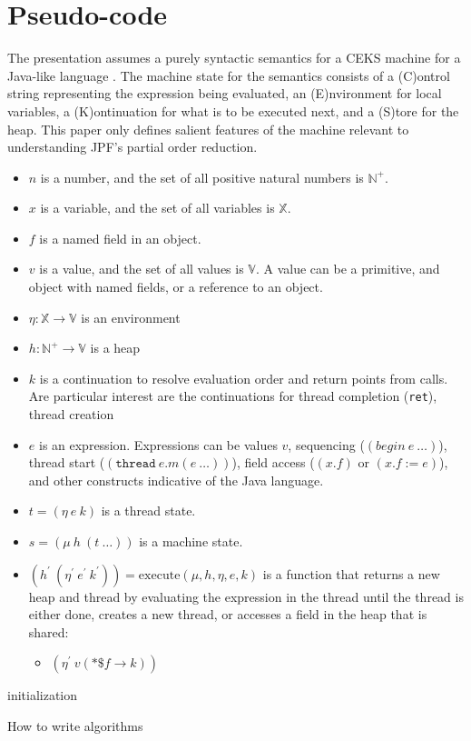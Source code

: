 \section{Pseudo-code}
The presentation assumes a purely syntactic semantics for a CEKS
machine for a Java-like language \cite{saints-MS}. The machine state
for the semantics consists of a (C)ontrol string representing the
expression being evaluated, an (E)nvironment for local variables, a
(K)ontinuation for what is to be executed next, and a (S)tore for the
heap. This paper only defines salient features of the machine relevant
to understanding JPF's partial order reduction. 
\begin{itemize}
\item $n$ is a number, and the set of all positive natural numbers is $\mathbb{N}^+$.
\item $x$ is a variable, and the set of all variables is $\mathbb{X}$.
\item $f$ is a named field in an object.
\item $v$ is a value, and the set of all values is $\mathbb{V}$. A value can be a primitive, and object with named fields, or a reference to an object. 
\item $\eta : \mathbb{X} \rightarrow \mathbb{V}$ is an environment
\item $h : \mathbb{N}^+ \rightarrow \mathbb{V}$ is a heap
\item $k$ is a continuation to resolve evaluation order and return points from calls. Are particular interest are the continuations for thread completion (\texttt{ret}), thread creation 
\item $e$ is an expression. Expressions can be values $v$, sequencing ($(begin\ e\ \ldots)$),
  thread start ($(\mathtt{thread}\ e.m(e\ \ldots))$), field access ($(x.f)$ or $(x.f := e)$), and other constructs
  indicative of the Java language.
\item $t = (\eta\ e\ k)$ is a thread state.
\item $s = (\mu\ h\ (t\ \ldots))$ is a machine state.
\item $(h^\prime\ (\eta^\prime \ e^\prime\ k^\prime)) = \mathrm{execute}(\mu, h, \eta, e, k)$ is a function that returns a new heap and thread by evaluating the expression in the thread until the thread is either done, creates a new thread, or accesses a field in the heap that is shared:
  \begin{itemize}
    \item $(\eta^\prime\ v (* \$ f \rightarrow k))$
  \end{itemize}
\end{itemize}


\begin{algorithm}
 \SetAlgoLined
 initialization\;
 \caption{How to write algorithms}
\end{algorithm}
